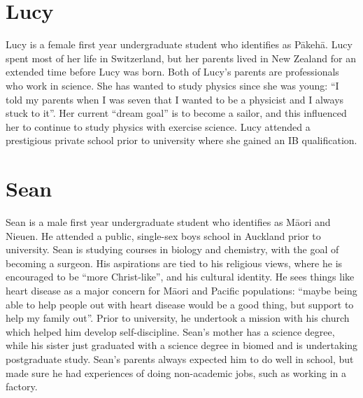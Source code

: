 \section*{Lucy}
Lucy is a female first year undergraduate student who identifies as P\={a}keh\={a}. Lucy spent most of her life in Switzerland, but her parents lived in New Zealand for an extended time before Lucy was born. Both of Lucy's parents are professionals who work in science. She has wanted to study physics since she was young: ``I told my parents when I was seven that I wanted to be a physicist and I always stuck to it''. Her current ``dream goal'' is to become a sailor, and this influenced her to continue to study physics with exercise science. Lucy attended a prestigious private school prior to university where she gained an IB qualification. 

\section*{Sean}
Sean is a male first year undergraduate student who identifies as M\={a}ori and Nieuen. He attended a public, single-sex boys school in Auckland prior to university. Sean is studying courses in biology and chemistry, with the goal of becoming a surgeon. His aspirations are tied to his religious views, where he is encouraged to be ``more Christ-like'', and his cultural identity. He sees things like heart disease as a major concern for M\={a}ori and Pacific populations: ``maybe being able to help people out with heart disease would be a good thing, but support to help my family out''. Prior to university, he undertook a mission with his church which helped him develop self-discipline. Sean's mother has a science degree, while his sister just graduated with a science degree in biomed and is undertaking postgraduate study. Sean's parents always expected him to do well in school, but made sure he had experiences of doing non-academic jobs, such as working in a factory. 

